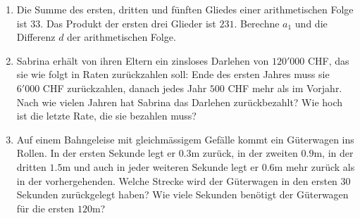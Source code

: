 \documentclass[11pt,oneside]{article}
\begin{document}
\begin{aufgabe}
\begin{enumerate}
			\item Die Summe des ersten, dritten und fünften Gliedes einer arithmetischen Folge ist $33$. Das Produkt der ersten drei Glieder ist $231$. Berechne $a_1$ und die Differenz $d$ der arithmetischen Folge.
			\item Sabrina erhält von ihren Eltern ein zinsloses Darlehen von $120'000$ CHF, das sie wie folgt in Raten zurückzahlen soll: Ende des ersten Jahres muss sie $6'000$ CHF zurückzahlen, danach jedes Jahr $500$ CHF mehr als im Vorjahr. Nach wie vielen Jahren hat Sabrina das Darlehen zurückbezahlt? Wie hoch ist die letzte Rate, die sie bezahlen muss? %
			\item Auf einem Bahngeleise mit gleichmässigem Gefälle kommt ein Güterwagen ins Rollen. In der ersten Sekunde legt er $0.3$m zurück, in der zweiten $0.9$m, in der dritten $1.5$m und auch in jeder weiteren Sekunde legt er $0.6$m mehr zurück als in der vorhergehenden. Welche Strecke wird der Güterwagen in den ersten $30$ Sekunden zurückgelegt haben? Wie viele Sekunden benötigt der Güterwagen für die ersten $120$m? %
		\end{enumerate}
	\end{aufgabe}
\end{document}
